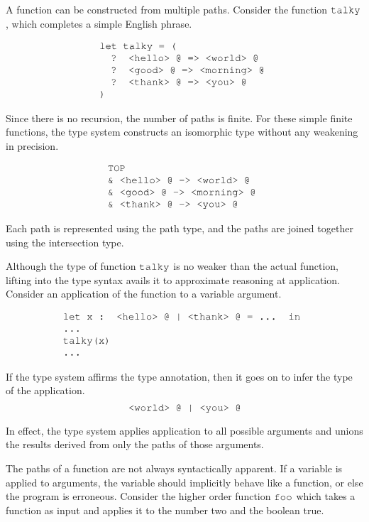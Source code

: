 \documentclass[acmsmall]{acmart}
\theoremstyle{definition}
\begin{document}
A function can be constructed from multiple paths. 
Consider the function $\J{talky}$, which completes a simple English phrase.

\[
  \begin{array}[t]{@{} l}
    \J{let talky = (}
      \\
      \I \J{? <hello> @ => <world> @}
      \\
      \I \J{? <good> @ => <morning> @} 
      \\
      \I \J{? <thank> @ => <you> @} 
      \\
    \J{)}
  \end{array}
\]

\noindent
Since there is no recursion, the number of paths is finite.
For these simple finite functions, the type system constructs
an isomorphic type without any weakening in precision. 

\[
  \begin{array}[t]{@{} l}
    \J{TOP}
      \\
      \J{\& <hello> @ -> <world> @}
      \\
      \J{\& <good> @ -> <morning> @} 
      \\
      \J{\& <thank> @ -> <you> @} 
  \end{array}
\]

\noindent
Each path is represented using the path type,
and the paths are joined together using the intersection type.

Although the type of function $\J{talky}$ is no weaker than the actual function,
lifting into the type syntax avails it to approximate reasoning at application.
Consider an application of the function to a variable argument. 

\[
  \begin{array}[t]{@{} l}
    \J{let x : <hello> @ | <thank> @ = ... in}
    \\
    \J{...}
    \\
    \J{talky(x)} 
    \\
    \J{...}
  \end{array}
\]

\noindent
If the type system affirms the type annotation,
then it goes on to infer the type of the application. 
\[
  \J{<world> @ | <you> @}
\]

\noindent
In effect, the type system applies application to all possible arguments
and unions the results derived from only the paths of those arguments. 

The paths of a function are not always syntactically apparent. 
If a variable is applied to arguments, the variable should implicitly behave 
like a function, or else the program is erroneous. 
Consider the higher order function $\J{foo}$ which takes a function as input
and applies it to the number two and the boolean true.
\end{document}
